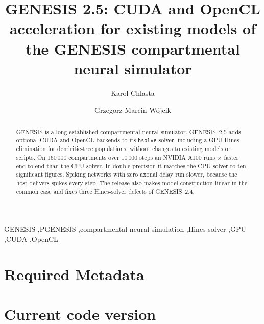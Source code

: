 \documentclass[preprint,12pt,a4paper]{elsarticle}
\begin{document}
\begin{frontmatter}

\title{GENESIS 2.5: CUDA and OpenCL acceleration for existing models of the GENESIS compartmental neural simulator}

\author[1]{Karol Chlasta}
\author[2]{Grzegorz Marcin W\'ojcik}
\address[1]{Kozminski University, ul. Jagiello\'nska 57/59, 03-301 Warsaw, Poland; WarsawIQ, Al. Jana Paw\l{}a II 43A/37B, 01-001 Warsaw, Poland}
\address[2]{Maria Curie-Sk{\l}odowska University, ul. Akademicka 9, 20-033 Lublin, Poland}

\begin{abstract}
GENESIS is a long-established compartmental neural simulator. GENESIS~2.5 adds
optional CUDA and OpenCL backends to its \texttt{hsolve} solver, including a GPU
Hines elimination for dendritic-tree populations, without changes to existing models
or scripts. On 160\,000 compartments over 10\,000 steps an NVIDIA A100 runs
$\times$ faster end to end than the CPU solver. In double
precision it matches the CPU solver to ten significant figures. Spiking networks with
zero axonal delay run slower, because the host delivers spikes every step. The release
also makes model construction linear in the common case and fixes three Hines-solver
defects of GENESIS~2.4.
\end{abstract}

\begin{keyword}
GENESIS \sep PGENESIS \sep compartmental neural simulation \sep Hines solver \sep GPU \sep CUDA \sep OpenCL
\end{keyword}

\end{frontmatter}

\section*{Required Metadata}
\section*{Current code version}
\end{document}
